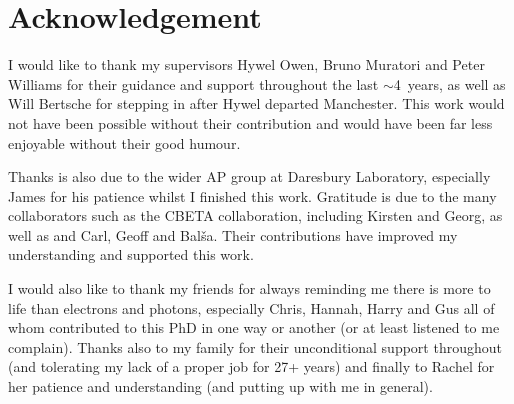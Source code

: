 \documentclass[11pt,oneside]{thesisformat}
\begin{document}
\chapter*{Acknowledgement}

I would like to thank my supervisors Hywel Owen, Bruno Muratori and Peter Williams for their guidance and support throughout the last $\sim$4~years, as well as Will Bertsche for stepping in after Hywel departed Manchester. This work would not have been possible without their contribution and would have been far less enjoyable without their good humour.

Thanks is also due to the wider AP group at Daresbury Laboratory, especially James for his patience whilst I finished this work. Gratitude is due to the many collaborators such as the CBETA collaboration, including Kirsten and Georg, as well as and Carl, Geoff and Bal{\v{s}}a. Their contributions have improved my understanding and supported this work.

I would also like to thank my friends for always reminding me there is more to life than electrons and photons, especially Chris, Hannah, Harry and Gus all of whom contributed to this PhD in one way or another (or at least listened to me complain). Thanks also to my family for their unconditional support throughout (and tolerating my lack of a proper job for 27+ years) and finally to Rachel for her patience and understanding (and putting up with me in general).







\end{document}
